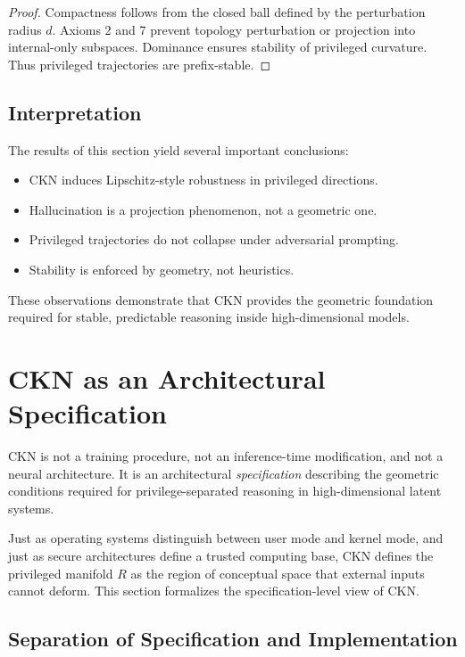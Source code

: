 \documentclass[11pt,a4paper]{article}
\begin{document}
\begin{proof}
Compactness follows from the closed ball defined by the perturbation radius $d$. Axioms 2 and 7 prevent topology perturbation or projection into internal-only subspaces. Dominance ensures stability of privileged curvature. Thus privileged trajectories are prefix-stable.
\end{proof}

\subsection{Interpretation}

The results of this section yield several important conclusions:
\begin{itemize}
    \item CKN induces Lipschitz-style robustness in privileged directions.
    \item Hallucination is a projection phenomenon, not a geometric one.
    \item Privileged trajectories do not collapse under adversarial prompting.
    \item Stability is enforced by geometry, not heuristics.
\end{itemize}

These observations demonstrate that CKN provides the geometric foundation required for stable, predictable reasoning inside high-dimensional models.

\section{CKN as an Architectural Specification}

CKN is not a training procedure, not an inference-time modification, and not a neural architecture. It is an architectural \emph{specification} describing the geometric conditions required for privilege-separated reasoning in high-dimensional latent systems.

Just as operating systems distinguish between user mode and kernel mode, and just as secure architectures define a trusted computing base, CKN defines the privileged manifold $R$ as the region of conceptual space that external inputs cannot deform. This section formalizes the specification-level view of CKN.

\subsection{Separation of Specification and Implementation}
\end{document}
